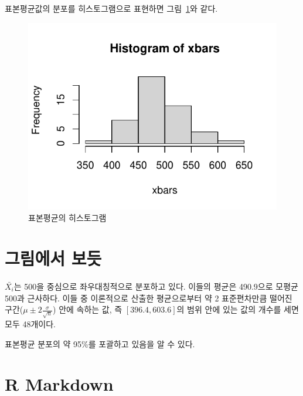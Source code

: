 \documentclass[
  chapter,a4paper,showtrims,openright,hidelinks]{oblivoir}
\begin{document}
표본평균값의 분포를 히스토그램으로 표현하면 그림~\ref{fig-test}와
같다.

\begin{figure}

{\centering \includegraphics{clt_files/figure-pdf/fig-test-1.pdf}

}

\caption{\label{fig-test}표본평균의 히스토그램}

\end{figure}

\hypertarget{uxadf8uxb9bcuxc5d0uxc11c-uxbcf4uxb4ef}{%
\section{그림에서 보듯}\label{uxadf8uxb9bcuxc5d0uxc11c-uxbcf4uxb4ef}}

\(\bar{X_i}\)는 500을 중심으로 좌우대칭적으로 분포하고 있다.
이들의 평균은 490.9으로 모평균 500과
근사하다. 이들 중 이론적으로 산출한
평균으로부터 약 2 표준편차만큼 떨어진
구간(\(\mu \pm 2\frac{\sigma}{\sqrt{n}}\)) 안에 속하는 값, 즉
\([396.4, 603.6]\)의 범위 안에 있는 값의 개수를 세면 모두
48개이다.

표본평균 분포의 약 95\%를 포괄하고 있음을 알 수
있다.

\hypertarget{r-markdown}{%
\section{R Markdown}\label{r-markdown}}
\end{document}
